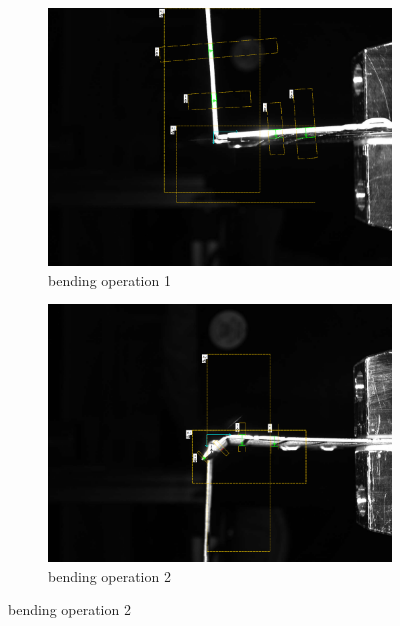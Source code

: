\begin{figure}[h]
    \centering
    \begin{subfigure}{0.48\textwidth}
        \centering
        \includegraphics[width=\textwidth]{figures/008_inspection/inpection_1_overlay2.png}
        \caption{bending operation 1}
        \label{subfig:inspection-1}
        \vspace{0.5cm}
    \end{subfigure}\hspace{0.25cm}
    \begin{subfigure}{0.48\textwidth}
        \centering
        \includegraphics[width=\textwidth]{figures/008_inspection/inspection_2_overlay.png}
        \caption{bending operation 2}

\end{subfigure}
\end{figure}

